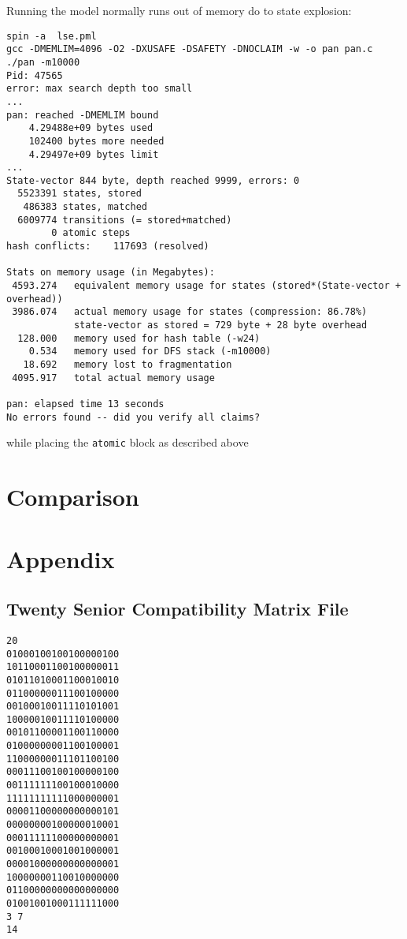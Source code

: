 \documentclass[a4paper]{article}
\begin{document}
Running the model normally runs out of memory do to state explosion:
\begin{verbatim}
spin -a  lse.pml
gcc -DMEMLIM=4096 -O2 -DXUSAFE -DSAFETY -DNOCLAIM -w -o pan pan.c
./pan -m10000 
Pid: 47565
error: max search depth too small
...
pan: reached -DMEMLIM bound
	4.29488e+09 bytes used
	102400 bytes more needed
	4.29497e+09 bytes limit
...
State-vector 844 byte, depth reached 9999, errors: 0
  5523391 states, stored
   486383 states, matched
  6009774 transitions (= stored+matched)
        0 atomic steps
hash conflicts:    117693 (resolved)

Stats on memory usage (in Megabytes):
 4593.274	equivalent memory usage for states (stored*(State-vector + overhead))
 3986.074	actual memory usage for states (compression: 86.78%)
         	state-vector as stored = 729 byte + 28 byte overhead
  128.000	memory used for hash table (-w24)
    0.534	memory used for DFS stack (-m10000)
   18.692	memory lost to fragmentation
 4095.917	total actual memory usage

pan: elapsed time 13 seconds
No errors found -- did you verify all claims?
\end{verbatim}

while placing the \texttt{atomic} block as described above 

\section{Comparison}


\section{Appendix}
\subsection{Twenty Senior Compatibility Matrix File}
\begin{verbatim}
20
01000100100100000100
10110001100100000011
01011010001100010010
01100000011100100000
00100010011110101001
10000010011110100000
00101100001100110000
01000000001100100001
11000000011101100100
00011100100100000100
00111111100100010000
11111111111000000001
00001100000000000101
00000000100000010001
00011111100000000001
00100010001001000001
00001000000000000001
10000000110010000000
01100000000000000000
01001001000111111000
3 7
14
\end{verbatim}
\end{document}
